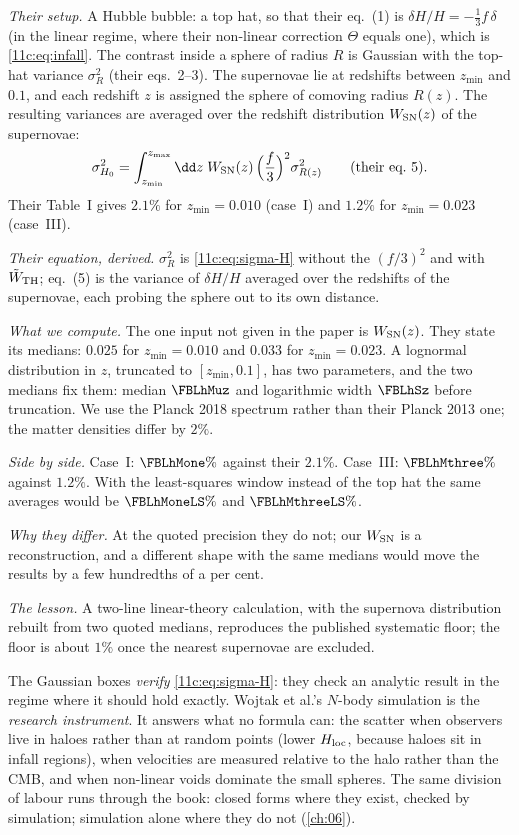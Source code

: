 \emph{Their setup.} A Hubble bubble: a top hat, so that their eq.~(1) is
$\delta H/H=-\tfrac13f\,\delta$ (in the linear regime, where their non-linear
correction $\Theta$ equals one), which is \eqref{11c:eq:infall}. The contrast inside a
sphere of radius $R$ is Gaussian with the top-hat variance $\sigma_R^2$ (their
eqs.~2--3). The supernovae lie at redshifts between $z_{\min}$ and $0.1$, and each
redshift $z$ is assigned the sphere of comoving radius $R(z)$. The resulting
variances are averaged over the redshift distribution $W_{\rm SN}(z)$ of the
supernovae:
\[
  \sigma_{H_0}^2=\int_{z_{\min}}^{z_{\max}}\dd z\;W_{\rm SN}(z)\,
  \Bigl(\frac f3\Bigr)^2\sigma_{R(z)}^2 \qquad\text{(their eq.~5)}.
\]
Their Table~I gives $2.1\%$ for $z_{\min}=0.010$ (case~I) and $1.2\%$ for
$z_{\min}=0.023$ (case~III).

\emph{Their equation, derived.} $\sigma_{R}^2$ is \eqref{11c:eq:sigma-H} without the
$(f/3)^2$ and with $\tilde W_{\rm TH}$; eq.~(5) is the variance of $\delta H/H$ averaged
over the redshifts of the supernovae, each probing the sphere out to its own
distance.

\emph{What we compute.} The one input not given in the paper is $W_{\rm SN}(z)$. They
state its medians: $0.025$ for $z_{\min}=0.010$ and $0.033$ for $z_{\min}=0.023$. A
lognormal distribution in $z$, truncated to $[z_{\min},0.1]$, has two parameters, and
the two medians fix them: median $\FBLhMuz$ and logarithmic width $\FBLhSz$ before
truncation. We use the Planck 2018 spectrum rather than their Planck 2013 one; the
matter densities differ by $2\%$.

\emph{Side by side.} Case~I: $\FBLhMone\%$ against their $2.1\%$. Case~III:
$\FBLhMthree\%$ against $1.2\%$. With the least-squares window instead of the top hat
the same averages would be $\FBLhMoneLS\%$ and $\FBLhMthreeLS\%$.

\emph{Why they differ.} At the quoted precision they do not; our $W_{\rm SN}$ is a
reconstruction, and a different shape with the same medians would move the
results by a few hundredths of a per cent.

\emph{The lesson.} A two-line linear-theory calculation, with the supernova
distribution rebuilt from two quoted medians, reproduces the published systematic
floor; the floor is about $1\%$ once the nearest supernovae are excluded.

\begin{inpractice}
The Gaussian boxes \emph{verify} \eqref{11c:eq:sigma-H}: they check an analytic result
in the regime where it should hold exactly. Wojtak et al.'s $N$-body simulation is
the \emph{research instrument}. It answers what no formula can: the scatter when
observers live in haloes rather than at random points (lower $H_{\rm loc}$, because
haloes sit in infall regions), when velocities are measured relative to the halo
rather than the CMB, and when non-linear voids dominate the small spheres. The same
division of labour runs through the book: closed forms where they exist, checked by
simulation; simulation alone where they do not (\cref{ch:06}).
\end{inpractice}

